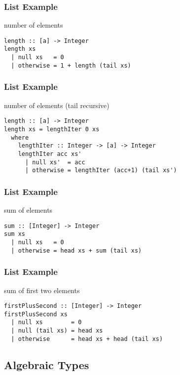 \documentclass[dvipsnames]{beamer}
\theoremstyle{plain}
\begin{document}
\begin{frame}[fragile]
  \frametitle{List Example}

  \begin{exampleblock}{number of elements}
    \begin{lstlisting}
length :: [a] -> Integer
length xs
  | null xs   = 0
  | otherwise = 1 + length (tail xs)
    \end{lstlisting}
  \end{exampleblock}
\end{frame}

\begin{frame}[fragile]
  \frametitle{List Example}

  \begin{exampleblock}{number of elements (tail recursive)}
    \begin{lstlisting}
length :: [a] -> Integer
length xs = lengthIter 0 xs
  where
    lengthIter :: Integer -> [a] -> Integer
    lengthIter acc xs'
      | null xs'  = acc
      | otherwise = lengthIter (acc+1) (tail xs')
    \end{lstlisting}
  \end{exampleblock}
\end{frame}

\begin{frame}[fragile]
  \frametitle{List Example}

  \begin{exampleblock}{sum of elements}
    \begin{lstlisting}
sum :: [Integer] -> Integer
sum xs
  | null xs   = 0
  | otherwise = head xs + sum (tail xs)
    \end{lstlisting}
  \end{exampleblock}
\end{frame}

\begin{frame}[fragile]
  \frametitle{List Example}

  \begin{exampleblock}{sum of first two elements}
    \begin{lstlisting}
firstPlusSecond :: [Integer] -> Integer
firstPlusSecond xs
  | null xs        = 0
  | null (tail xs) = head xs
  | otherwise      = head xs + head (tail xs)
    \end{lstlisting}
  \end{exampleblock}
\end{frame}

\subsection{Algebraic Types}
\end{document}
